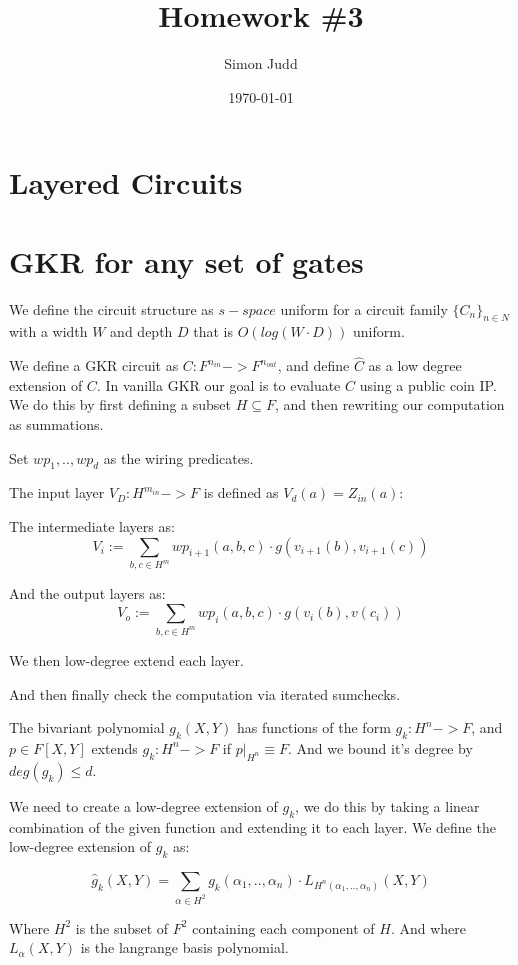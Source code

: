 \documentclass{article}
\title{Homework \#3}
\author{Simon Judd}
\date{\today}
\begin{document}
\maketitle

\section{Layered Circuits}

\section{GKR for any set of gates}

We define the circuit structure as $s-space$ uniform for a circuit family $\{C_{n}\}_{n \in N}$ with a width $W$ and depth $D$ that is $O(log(W \cdot D))$ uniform.

We define a GKR circuit as $C:F^{n_{in}} -> F^{n_{out}}$, and define $\hat{C}$ as a low degree extension of $C$. In vanilla GKR our goal is to evaluate $C$ using a public coin IP. We do this by first defining a subset $H \subseteq F$, and then rewriting our computation as summations.

Set $wp_{1},..,wp_{d}$ as the wiring predicates.

The input layer $V_{D}:H^{m_{in}}->F$ is defined as $V_{d}(a)=Z_{in}(a)$:

The intermediate layers as:
$$
V_{i} := \sum_{b, c \in H^{m}} wp_{i+1}(a,b,c) \cdot g(v_{i+1}(b), v_{i+1}(c))
$$

And the output layers as:
$$
V_{o} := \sum_{b, c \in H^{m}} wp_{i}(a,b,c) \cdot g(v_{i}(b), v(c_{i}))
$$

We then low-degree extend each layer.

And then finally check the computation via iterated sumchecks.

The bivariant polynomial $g_{k}(X,Y)$ has functions of the form $g_{k}:H^{n} -> F$, and $p \in F[X,Y]$ extends $g_{k}:H^{n} -> F$ if $p|_{H^{n}} \equiv F$.  And we bound it's degree by $deg(g_{k}) \le d$.

We need to create a low-degree extension of $g_{k}$, we do this by taking a linear combination of the given function and extending it to each layer.  We define the low-degree extension of $g_{k}$ as:

$$
\hat{g}_{k}(X,Y) = \sum_{\alpha \in H^{2}} g_{k}(\alpha_{1},..,\alpha_{n}) \cdot L_{H^{n}(\alpha_{1},..,\alpha_{n})}(X, Y)
$$


Where $H^{2}$ is the subset of $F^{2}$ containing each component of $H$.
And where $L_{\alpha}(X,Y)$ is the langrange basis polynomial.
\end{document}
